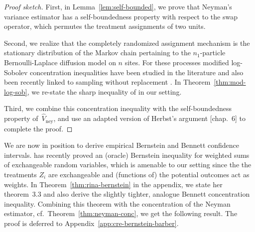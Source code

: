 \documentclass[aos]{imsart2}
\theoremstyle{plain}
\theoremstyle{definition}
\newcommand{\vhn}{\hat{V}_{\mathrm{ney}}}
\begin{document}
\begin{proof}[Proof sketch]
	First, in Lemma~\ref{lem:self-bounded}, we prove that Neyman's variance estimator has a self-boundedness property with respect to the swap operator, which permutes the treatment assignments of two units.
    
    Second, we realize that the completely randomized assignment mechanism is the stationary distribution of the Markov chain pertaining to the $n_1$-particle Bernoulli-Laplace diffusion model on $n$ sites. For these processes modified log-Sobolev concentration inequalities have been studied in the literature \citep{lee_logarithmic_1998} and also been recently linked to sampling without replacement \citep{sambale_concentration_2022}. In Theorem~\ref{thm:mod-log-sob}, we re-state the sharp inequality of \citet{salez_sharp_2021} in our setting.
    
    Third, we combine this concentration inequality with the self-boundedness property of~$\vhn$, and use an adapted version of Herbst's argument \citep{boucheron_concentration_2013}[chap.\ 6] to complete the proof.
\end{proof}

We are now in position to derive empirical Bernstein and Bennett confidence intervals. \citet{barber_hoeffding_2024} has recently proved an (oracle) Bernstein inequality for weighted sums of exchangeable random variables, which is amenable to our setting since the the treatments $Z_i$ are exchangeable and (functions of) the potential outcomes act as weights. In Theorem~\ref{thm:rina-bernstein} in the appendix, we state her theorem~3.3 and also derive the slightly tighter, analogue Bennett concentration inequality. Combining this theorem with the concentration of the Neyman estimator, cf.\ Theorem~\ref{thm:neyman-conc}, we get the following result. The proof is deferred to Appendix~\ref{app:cre-bernstein-barber}.
\end{document}
